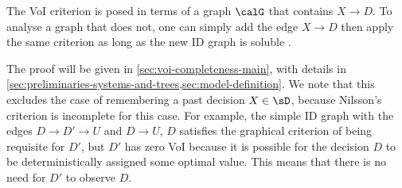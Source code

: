 

The VoI criterion is posed in terms of a graph $\calG$ that contains $X \to D$.
To analyse a graph that does not, %
one can simply add the edge $X \to D$ then apply the 
same criterion
as long as the new ID graph is soluble \citep{Shachter2016}.

The proof will be given in \cref{sec:voi-completeness-main}, with details in \cref{sec:preliminaries-systems-and-trees,sec:model-definition}.
We note that this excludes the case of remembering a past decision $X \in \sD$, 
because 
Nilsson's criterion
is incomplete for this case.
For example, the simple ID graph with the edges $D\to D'\to U$ and $D\to U$, $D$ satisfies the graphical criterion of being requisite for $D'$, but $D'$ has zero VoI because it is possible for the decision $D$ to be deterministically assigned some optimal value. This means that there is no need for $D'$ to observe $D$.~
